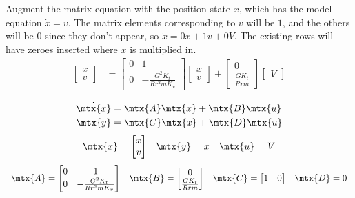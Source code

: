 Augment the matrix equation with the position state $x$, which has the model
equation $\dot{x} = v$. The matrix elements corresponding to $v$ will be $1$,
and the others will be $0$ since they don't appear, so $\dot{x} = 0x + 1v + 0V$.
The existing rows will have zeroes inserted where $x$ is multiplied in.
\begin{align*}
  \dot{\begin{bmatrix}
    x \\
    v
  \end{bmatrix}} &=
  \begin{bmatrix}
    0 & 1 \\
    0 & -\frac{G^2 K_t}{Rr^2 m K_v}
  \end{bmatrix}
  \begin{bmatrix}
    x \\
    v
  \end{bmatrix} +
  \begin{bmatrix}
    0 \\
    \frac{GK_t}{Rrm}
  \end{bmatrix}
  \begin{bmatrix}
    V
  \end{bmatrix}
\end{align*}
\begin{theorem}
  \begin{align*}
    \dot{\mtx{x}} &= \mtx{A} \mtx{x} + \mtx{B} \mtx{u} \\
    \mtx{y} &= \mtx{C} \mtx{x} + \mtx{D} \mtx{u}
  \end{align*}
  \begin{equation*}
    \begin{array}{ccc}
      \mtx{x} =
      \begin{bmatrix}
        x \\
        v
      \end{bmatrix} &
      \mtx{y} = x &
      \mtx{u} = V
    \end{array}
  \end{equation*}
  \begin{equation}
    \begin{array}{cccc}
      \mtx{A} =
      \begin{bmatrix}
        0 & 1 \\
        0 & -\frac{G^2 K_t}{Rr^2 mK_v}
      \end{bmatrix} &
      \mtx{B} =
      \begin{bmatrix}
        0 \\
        \frac{GK_t}{Rrm}
      \end{bmatrix} &
      \mtx{C} =
      \begin{bmatrix}
        1 & 0
      \end{bmatrix} &
      \mtx{D} = 0
    \end{array}
  \end{equation}
\end{theorem}

